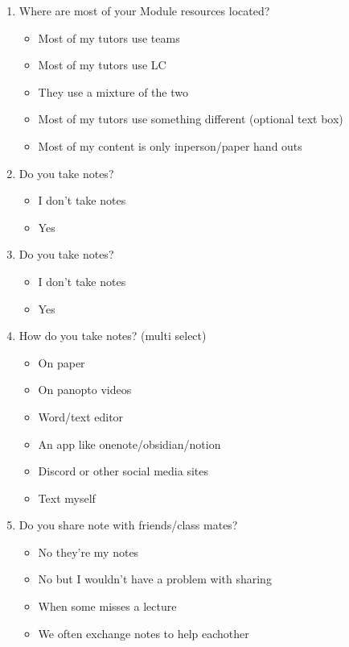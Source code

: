 \begin{enumerate}
    \item Where are most of your Module resources located?
    \begin{itemize}
        \item Most of my tutors use teams
        \item Most of my tutors use LC
        \item They use a mixture of the two
        \item Most of my tutors use something different (optional text box)
        \item Most of my content is only inperson/paper hand outs 
    \end{itemize}
    
    \item Do you take notes?
    \begin{itemize}
        \item I don't take notes 
        \item Yes 
    \end{itemize}
    
    \item Do you take notes?
    \begin{itemize}
        \item I don't take notes 
        \item Yes 
    \end{itemize}
    
    \item How do you take notes? (multi select)
    \begin{itemize}
        \item On paper
        \item On panopto videos
        \item Word/text editor
        \item An app like onenote/obsidian/notion
        \item Discord or other social media sites
        \item Text myself
    \end{itemize}
    
    \item Do you share note with friends/class mates?
    \begin{itemize}
        \item No they're my notes
        \item No but I wouldn't have a problem with sharing 
        \item When some misses a lecture 
        \item We often exchange notes to help eachother  
    \end{itemize}
    

\end{enumerate}
